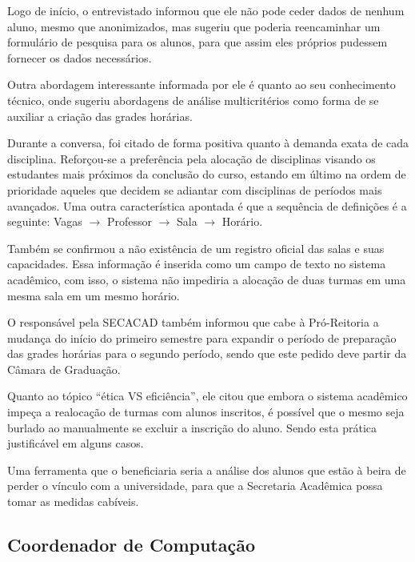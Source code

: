
Logo de início, o entrevistado informou que ele não pode ceder dados de nenhum aluno, mesmo que anonimizados, mas sugeriu que poderia reencaminhar um formulário de pesquisa para os alunos, para que assim eles próprios pudessem fornecer os dados necessários.

Outra abordagem interessante informada por ele é quanto ao seu conhecimento técnico, onde sugeriu abordagens de análise multicritérios como forma de se auxiliar a criação das grades horárias.

Durante a conversa, foi citado de forma positiva quanto à demanda exata de cada disciplina. Reforçou-se a preferência pela alocação de disciplinas visando os estudantes mais próximos da conclusão do curso, estando em último na ordem de prioridade aqueles que decidem se adiantar com disciplinas de períodos mais avançados. Uma outra característica apontada é que a sequência de definições é a seguinte: Vagas $\rightarrow$ Professor $\rightarrow$ Sala $\rightarrow$ Horário.

Também se confirmou a não existência de um registro oficial das salas e suas capacidades. Essa informação é inserida como um campo de texto no sistema acadêmico, com isso, o sistema não impediria a alocação de duas turmas em uma mesma sala em um mesmo horário.

O responsável pela SECACAD também informou que cabe à Pró-Reitoria a mudança do início do primeiro semestre para expandir o período de preparação das grades horárias para o segundo período, sendo que este pedido deve partir da Câmara de Graduação.

Quanto ao tópico ``ética VS eficiência'', ele citou que embora o sistema acadêmico impeça a realocação de turmas com alunos inscritos, é possível que o mesmo seja burlado ao manualmente se excluir a inscrição do aluno. Sendo esta prática justificável em alguns casos.

Uma ferramenta que o beneficiaria seria a análise dos alunos que estão à beira de perder o vínculo com a universidade, para que a Secretaria Acadêmica possa tomar as medidas cabíveis.

\subsection{Coordenador de Computação} %

